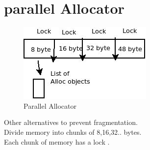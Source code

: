 \documentclass[twoside]{article}
\begin{document}
\section{parallel Allocator}
\begin{figure}[h]
\centering
\includegraphics[scale=.50]{Diagram4.jpeg}
\caption{Parallel Allocator \label{Parallel Allocator}}
\end{figure}
Other alternatives to prevent fragmentation. \\
Divide memory into chunks of 8,16,32.. bytes. \\
Each chunk of memory has a lock .
\end{document}
